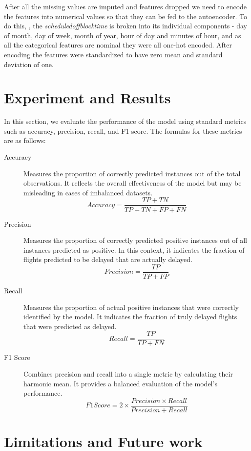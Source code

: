 \documentclass[twoside,11pt]{article}
\begin{document}
After all the missing values are imputed and features dropped we need to encode the features into numerical values so that they can be fed to the autoencoder. To do this, , the \emph{scheduledoffblocktime} is broken into its individual components - day of month, day of week, month of year, hour of day and minutes of hour, and as all the categorical features are nominal they were all one-hot encoded. After encoding the features were standardized to have zero mean and standard deviation of one.

\section{Experiment and Results}
In this section, we evaluate the performance of the model using standard metrics such as accuracy, precision, recall, and F1-score. The formulas for these metrics are as follows:

\begin{description}
    \item[Accuracy] Measures the proportion of correctly predicted instances out of the total observations. It reflects the overall effectiveness of the model but may be misleading in cases of imbalanced datasets.
        $$
        {Accuracy} = \frac{{TP} + {TN}}{{TP} + {TN} + {FP} + {FN}}
        $$
    \item[Precision] Measures the proportion of correctly predicted positive instances out of all instances predicted as positive. In this context, it indicates the fraction of flights predicted to be delayed that are actually delayed.
        $$
        {Precision} = \frac{{TP}}{{TP} + {FP}}
        $$
    \item[Recall] Measures the proportion of actual positive instances that were correctly identified by the model. It indicates the fraction of truly delayed flights that were predicted as delayed.
        $$
        {Recall} = \frac{{TP}}{{TP} + {FN}}
        $$  
    \item[F1 Score] Combines precision and recall into a single metric by calculating their harmonic mean. It provides a balanced evaluation of the model’s performance.
        $$
        {F1 Score} = 2 \times \frac{{Precision} \times {Recall}}{{Precision} + {Recall}}
        $$
\end{description} 

\section{Limitations and Future work}
\end{document}
